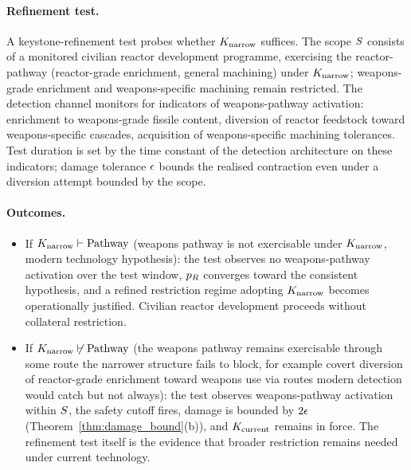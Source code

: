 \paragraph{Refinement test.}
A keystone-refinement test probes whether
$K_{\mathrm{narrow}}$ suffices.  The scope $S$
consists of a monitored civilian reactor development programme,
exercising the reactor-pathway (reactor-grade enrichment, general
machining) under $K_{\mathrm{narrow}}$; weapons-grade
enrichment and weapons-specific machining remain restricted.  The
detection channel monitors for indicators of weapons-pathway
activation: enrichment to weapons-grade fissile content, diversion
of reactor feedstock toward weapons-specific cascades, acquisition
of weapons-specific machining tolerances.  Test duration is set
by the time constant of the detection architecture on these
indicators; damage tolerance $\epsilon$ bounds the realised
contraction even under a diversion attempt bounded by the scope.

\paragraph{Outcomes.}
\begin{itemize}
\item If $K_{\mathrm{narrow}} \vdash \mathrm{Pathway}$
  (weapons pathway is not exercisable under
  $K_{\mathrm{narrow}}$, modern technology
  hypothesis): the test observes no weapons-pathway activation
  over the test window, $p_R$ converges toward the consistent
  hypothesis, and a refined restriction regime adopting
  $K_{\mathrm{narrow}}$ becomes operationally
  justified.  Civilian reactor development proceeds without
  collateral restriction.
\item If $K_{\mathrm{narrow}} \not\vdash \mathrm{Pathway}$
  (the weapons pathway remains exercisable through some route
  the narrower structure fails to block, for example covert
  diversion of reactor-grade enrichment toward weapons use via
  routes modern detection would catch but not always): the test
  observes weapons-pathway activation within $S$, the
  safety cutoff fires, damage is bounded by $2 \epsilon$
  (Theorem~\ref{thm:damage_bound}(b)), and
  $K_{\mathrm{current}}$ remains in force.  The
  refinement test itself is the evidence that broader
  restriction remains needed under current technology.
\end{itemize}

